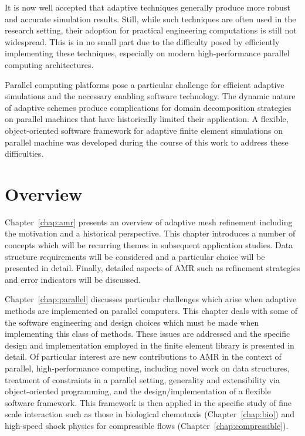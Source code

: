 It is now well accepted that adaptive techniques generally produce more robust and accurate simulation results.  Still, while such techniques are often used in the research setting, their adoption for practical engineering computations is still not widespread.  This is in no small part due to the difficulty posed by efficiently implementing these techniques, especially on modern high-performance parallel computing architectures.

Parallel computing platforms pose a particular challenge for efficient adaptive simulations and the necessary enabling software technology.  The dynamic nature of adaptive schemes produce complications for domain decomposition strategies on parallel machines that have historically limited their application.  A flexible, object-oriented software framework for adaptive finite element simulations on parallel machine was developed during the course of this work to address these difficulties.

\section{Overview}
Chapter~\ref{chap:amr} presents an overview of adaptive mesh refinement including the motivation and  a historical perspective.  This chapter introduces a number of concepts which will be recurring themes in subsequent application studies.  Data structure requirements will be considered and a particular choice will be presented in detail.  Finally, detailed aspects of AMR such as refinement strategies and error indicators will be discussed.

Chapter~\ref{chap:parallel} discusses particular challenges which arise when adaptive methods are implemented on parallel computers.  This chapter deals with some of the software engineering and design choices which must be made when implementing this class of methods.  These issues are addressed and the specific design and implementation employed in the \libMesh{} finite element library is presented in detail. Of particular interest are new contributions to AMR in the context of parallel, high-performance computing, including novel work on data structures, treatment of constraints in a parallel setting, generality and extensibility via object-oriented programming, and the design/implementation of a flexible software framework.  This framework is then applied in the specific study of fine scale interaction such as those in biological chemotaxis (Chapter~\ref{chap:bio}) and high-speed shock physics for compressible flows (Chapter~\ref{chap:compressible}).

